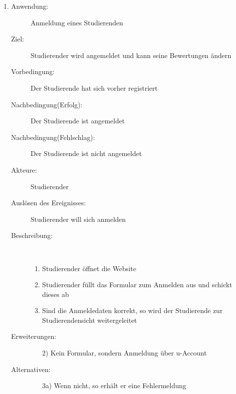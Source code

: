 \documentclass[parskip=full]{scrartcl}
\newcommand{\swtLabel}[1]{\textbf{/#1\arabic*0/}}
\begin{document}
\begin{enumerate}[label=\swtLabel{S}]
  \item
    \begin{description}
    \item[Anwendung:] Anmeldung eines Studierenden
    \item[Ziel:] Studierender wird angemeldet und kann seine Bewertungen ändern
  	\item[Vorbedingung:] Der Studierende hat sich vorher registriert
  	\item[Nachbedingung(Erfolg):] Der Studierende ist angemeldet
  	\item[Nachbedingung(Fehlschlag):] Der Studierende ist nicht angemeldet
  	\item[Akteure:] Studierender
  	\item[Auslösen des Ereignisses:] Studierender will sich anmelden
  	\item[Beschreibung:]~
  	\begin{enumerate}
  	  \item Studierender öffnet die Website
  	  \item Studierender füllt das Formular zum Anmelden aus und schickt dieses
  	  ab
  	  \item Sind die Anmeldedaten korrekt, so wird der Studierende zur
  	  Studierendensicht weitergeleitet
  	\end{enumerate}
  	\item[Erweiterungen:]
  	\begin{enumerate}
  	  \item[2)] Kein Formular, sondern Anmeldung über u-Account
  	\end{enumerate}    	
  	\item[Alternativen:]
	\begin{enumerate}
  	  \item[3a)] Wenn nicht, so erhält er eine Fehlermeldung
  	\end{enumerate}
  \end{description}
   

\end{enumerate}
\end{document}
